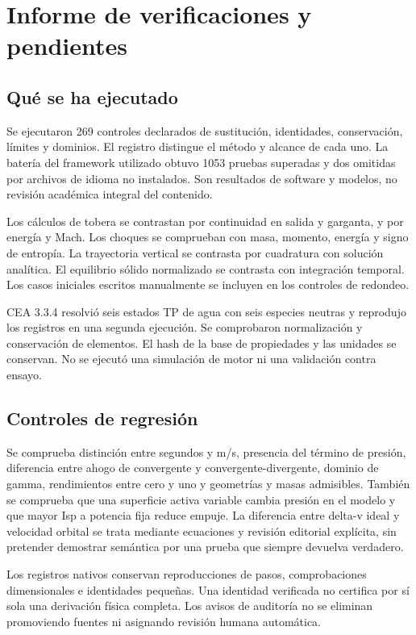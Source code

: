 \chapter{Informe de verificaciones y pendientes}\label{app:checks}
\section{Qué se ha ejecutado}
Se ejecutaron 269 controles declarados de sustitución, identidades, conservación, límites y dominios. El registro distingue el método y alcance de cada uno. La batería del framework utilizado obtuvo 1053 pruebas superadas y dos omitidas por archivos de idioma no instalados. Son resultados de software y modelos, no revisión académica integral del contenido.


Los cálculos de tobera se contrastan por continuidad en salida y garganta, y por energía y Mach. Los choques se comprueban con masa, momento, energía y signo de entropía. La trayectoria vertical se contrasta por cuadratura con solución analítica. El equilibrio sólido normalizado se contrasta con integración temporal. Los casos iniciales escritos manualmente se incluyen en los controles de redondeo.

CEA 3.3.4 resolvió seis estados TP de agua con seis especies neutras y reprodujo los registros en una segunda ejecución. Se comprobaron normalización y conservación de elementos. El hash de la base de propiedades y las unidades se conservan. No se ejecutó una simulación de motor ni una validación contra ensayo.
\section{Controles de regresión}
Se comprueba distinción entre segundos y m/s, presencia del término de presión, diferencia entre ahogo de convergente y convergente-divergente, dominio de gamma, rendimientos entre cero y uno y geometrías y masas admisibles. También se comprueba que una superficie activa variable cambia presión en el modelo y que mayor Isp a potencia fija reduce empuje. La diferencia entre delta-v ideal y velocidad orbital se trata mediante ecuaciones y revisión editorial explícita, sin pretender demostrar semántica por una prueba que siempre devuelva verdadero.

Los registros nativos conservan reproducciones de pasos, comprobaciones dimensionales e identidades pequeñas. Una identidad verificada no certifica por sí sola una derivación física completa. Los avisos de auditoría no se eliminan promoviendo fuentes ni asignando revisión humana automática.

